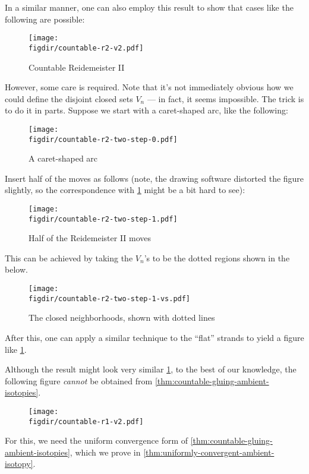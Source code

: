 \begin{example}
  In a similar manner, one can also employ this result to show that
  cases like the following are possible:
  \begin{figure}[H]
    \centering
    \texttt{[image: \\figdir/countable-r2-v2.pdf]}
    \caption{Countable Reidemeister II}
    \label{fig:countable-reidemeister-ii}
  \end{figure}
  However, some care is required. Note that it's not immediately
  obvious how we could define the disjoint closed sets $V_n$ --- in
  fact, it seems impossible. The trick is to do it in parts. Suppose
  we start with a caret-shaped arc, like the following:
  \begin{figure}[H]
    \centering
    \texttt{[image: \\figdir/countable-r2-two-step-0.pdf]}
    \caption{A caret-shaped arc}
  \end{figure}
  Insert half of the moves as follows (note, the drawing software
  distorted the figure slightly, so the correspondence with
  \cref{fig:countable-reidemeister-ii} might be a bit hard to see):
  \begin{figure}[H]
    \centering
    \texttt{[image: \\figdir/countable-r2-two-step-1.pdf]}
    \caption{Half of the Reidemeister II moves}
  \end{figure}
  This can be achieved by taking the $V_n$'s to be the dotted regions
  shown in the below.
  \begin{figure}[H]
    \centering
    \hspace{1.5em}
    \texttt{[image: \\figdir/countable-r2-two-step-1-vs.pdf]}
    \caption{The closed neighborhoods, shown with dotted lines}
  \end{figure}
  After this, one can apply a similar technique to the ``flat''
  strands to yield a figure like \cref{fig:countable-reidemeister-ii}.
\end{example}
\begin{remark}
  Although the result might look very similar
  \cref{fig:countable-reidemeister-ii}, to the best of our knowledge,
  the following figure \emph{cannot} be obtained from
  \cref{thm:countable-gluing-ambient-isotopies}.
  \begin{figure}[H]
    \centering
    \texttt{[image: \\figdir/countable-r1-v2.pdf]}
  \end{figure}
  For this, we need the uniform convergence form of
  \cref{thm:countable-gluing-ambient-isotopies}, which we prove in
  \cref{thm:uniformly-convergent-ambient-isotopy}.
\end{remark}

